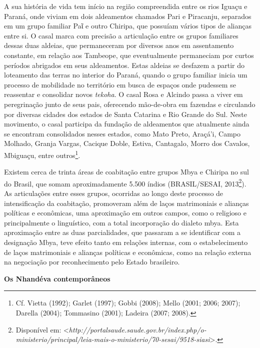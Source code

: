 A sua história de vida tem início na região compreendida entre os rios
Iguaçu e Paraná, onde viviam em dois aldeamentos chamados Pari e
Piracanju, separados em um grupo familiar Paῖ e outro Chiripa, que
possuíam vários tipos de alianças entre si. O casal marca com precisão a
articulação entre os grupos familiares dessas duas aldeias, que
permaneceram por diversos anos em assentamento constante, em relação aos
Tambeope, que eventualmente permaneciam por curtos períodos abrigados em
seus aldeamentos. Estas aldeias se desfazem a partir do loteamento das
terras no interior do Paraná, quando o grupo familiar inicia um processo
de mobilidade no território em busca de espaços onde pudessem se
reassentar e consolidar novos \emph{tekoha}. O casal Rosa e Alcindo
passa a viver em peregrinação junto de seus pais, oferecendo mão-de-obra
em fazendas e circulando por diversas cidades dos estados de Santa
Catarina e Rio Grande do Sul. Neste movimento, o casal participa da
fundação de aldeamentos que atualmente ainda se encontram consolidados
nesses estados, como Mato Preto, Araçá'i, Campo Molhado, Granja Vargas,
Cacique Doble, Estiva, Cantagalo, Morro dos Cavalos, Mbiguaçu, entre
outros\footnote{Cf. Vietta (1992); Garlet (1997); Gobbi (2008); Mello
  (2001; 2006; 2007); Darella (2004); Tommasino (2001); Ladeira (2007;
  2008).}.

Existem cerca de trinta áreas de coabitação entre grupos Mbya e Chiripa
no sul do Brasil, que somam aproximadamente 5.500 índios (BRASIL/SESAI,
2013\footnote{Disponível em:
  \textless{}\emph{http://portalsaude.saude.gov.br/index.php/o-ministerio/principal/leia-mais-o-ministerio/70-sesai/9518-siasi}\textgreater{}.}).
As articulações entre esses grupos, ocorridas ao longo deste processo de
intensificação da coabitação, promoveram além de laços matrimoniais e
alianças políticas e econômicas, uma aproximação em outros campos, como
o religioso e principalmente o linguístico, com a total incorporação do
dialeto mbya. Esta aproximação entre as duas parcialidades, que passaram
a se identificar com a designação Mbya, teve efeito tanto em relações
internas, com o estabelecimento de laços matrimoniais e alianças
políticas e econômicas, como na relação externa na negociação por
reconhecimento pelo Estado brasileiro.

\textbf{Os Nhandéva contemporâneos}

